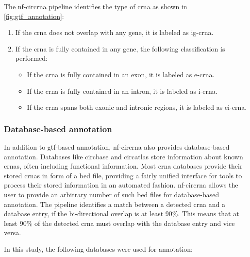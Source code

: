 The \gls{nf-circrna} pipeline identifies the type of \gls{crna} as shown in
\cref{fig:gtf_annotation}: \begin{enumerate} \item If the \gls{crna} does not
            overlap with any gene, it is labeled as \gls{ig-crna}.
      \item If the \gls{crna} is fully contained in any gene, the following
            classification is performed:
            \begin{itemize}
                  \item If the \gls{crna} is fully contained in an exon, it is
                        labeled as \gls{e-crna}.
                  \item If the \gls{crna} is fully contained in an intron, it
                        is
                        labeled as \gls{i-crna}.
                  \item If the \gls{crna} spans both exonic and intronic
                        regions,
                        it is labeled as \gls{ei-crna}.
            \end{itemize}
\end{enumerate}

\subsubsection{Database-based annotation}
\label{sec:database_annotation}
In addition to \gls{gtf}-based annotation, \gls{nf-circrna} also provides
database-based annotation.
Databases like \gls{circbase} and \gls{circatlas} store information about known
\glspl{crna}, often including functional
information\supercite{glazar_circbase_2014,wu_circatlas_2023}.
Most \gls{crna} databases provide their stored \glspl{crna} in form of a
\gls{bed} file, providing a fairly unified interface for tools to process their
stored information in an automated fashion.
\gls{nf-circrna} allows the user to provide an arbitrary number of such
\gls{bed}
files for database-based annotation.
The pipeline identifies a match between a detected \gls{crna} and a database
entry, if the bi-directional overlap is at least 90\%.
This means that at least 90\% of the detected \gls{crna} must overlap with the
database entry and vice versa.

In this study, the following databases were used for annotation:

